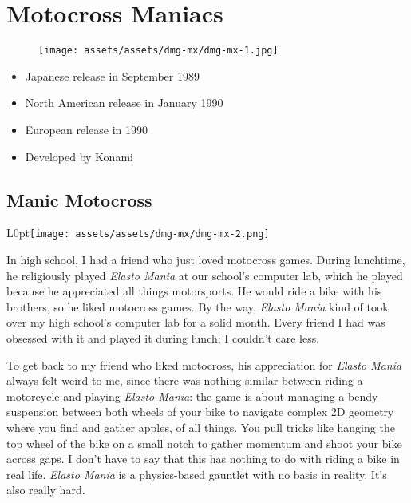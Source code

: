 \documentclass{book}
\begin{document}
\chapter*{Motocross Maniacs}
\vspace{\baselineskip}\begin{figure}[H]{\texttt{[image: assets/assets/dmg-mx/dmg-mx-1.jpg]}}\end{figure}\vspace{\baselineskip}
\begin{itemize}[left=0pt, nosep]
\item Japanese release in September 1989
\item North American release in January 1990
\item European release in 1990
\item Developed by Konami

\end{itemize}
\newpage\FloatBarrier\section*{Manic Motocross}
\begin{wrapfigure}{L}{0pt}{\texttt{[image: assets/assets/dmg-mx/dmg-mx-2.png]}}\end{wrapfigure}\noindent
In high school, I had a friend who just loved motocross games. During lunchtime, he religiously played \emph{Elasto Mania} at our school’s computer lab, which he played because he appreciated all things motorsports. He would ride a bike with his brothers, so he liked motocross games. By the way, \emph{Elasto Mania} kind of took over my high school’s computer lab for a solid month. Every friend I had was obsessed with it and played it during lunch; I couldn’t care less.\par
To get back to my friend who liked motocross, his appreciation for \emph{Elasto Mania} always felt weird to me, since there was nothing similar between riding a motorcycle and playing \emph{Elasto Mania}: the game is about managing a bendy suspension between both wheels of your bike to navigate complex 2D geometry where you find and gather apples, of all things. You pull tricks like hanging the top wheel of the bike on a small notch to gather momentum and shoot your bike across gaps. I don’t have to say that this has nothing to do with riding a bike in real life. \emph{Elasto Mania} is a physics-based gauntlet with no basis in reality. It’s also really hard.\par
\end{document}
